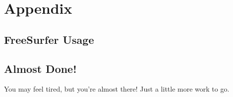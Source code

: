\chapter*{Appendix}
\renewcommand{\thesection}{\Alph{section}}

\section{FreeSurfer Usage}

\section{Almost Done!}
You may feel tired, but you're almost there! Just a little more work to go.

